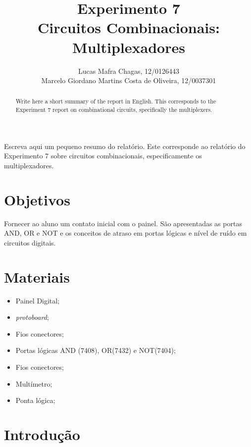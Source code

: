 \documentclass[12pt]{article}
\title{Experimento 7\\ 
Circuitos Combinacionais: Multiplexadores}
\author{Lucas Mafra Chagas, 12/0126443\\
        Marcelo Giordano Martins Costa de Oliveira,  12/0037301\\
}
\begin{document}
 

\maketitle

 \begin{abstract}
   Write here a short summary of the report in English. This corresponds to the Experiment 7 report on combinational circuits, specifically the multiplexers.
 \end{abstract}
     
 \begin{resumo} 
  Escreva aqui um pequeno resumo do relatório. Este corresponde ao relatório do Experimento 7 sobre circuitos combinacionais, especificamente os multiplexadores.
 \end{resumo}


\section{Objetivos}
\label{sec:Objetivos}

Fornecer ao aluno um contato inicial com o painel. São apresentadas as portas AND, OR e
NOT e os conceitos de atraso em portas lógicas e nível de ruído em circuitos digitais.

\section{Materiais} 
\label{sec:Materiais}

\begin{itemize}
    \item Painel Digital;
    
    \item \textit{protoboard};
    
    \item Fios conectores;
    
    \item Portas lógicas AND (7408), OR(7432) e NOT(7404);
    
    \item Fios conectores;
    
    \item Multímetro;
    
    \item Ponta lógica;
    
\end{itemize}


\section{Introdução}
\label{sec:Introducao}
\end{document}
